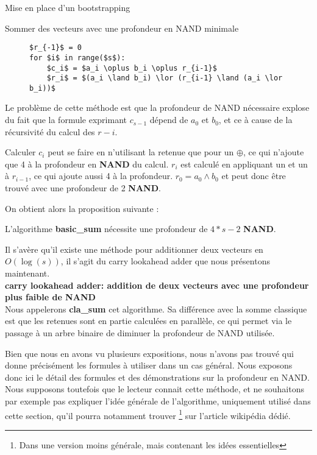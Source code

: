\begin{section}{Mise en place d'un bootstrapping}
\begin{subsection}{Sommer des vecteurs avec une profondeur en NAND minimale}
\begin{figure}[!h]
\begin{lstlisting}
$r_{-1}$ = 0
for $i$ in range($s$):
	$c_i$ = $a_i \oplus b_i \oplus r_{i-1}$
	$r_i$ = $(a_i \land b_i) \lor (r_{i-1} \land (a_i \lor b_i))$
\end{lstlisting}
\end{figure}

	Le problème de cette méthode est que la profondeur de NAND nécessaire explose du fait que la formule exprimant $c_{s-1}$ dépend de $a_0$ et $b_0$, et ce à cause de la récursivité du calcul des $r-i$.

	Calculer $c_i$ peut se faire en n'utilisant la retenue que pour un $\oplus$, ce qui n'ajoute que 4 à la profondeur en \textbf{NAND} du calcul. $r_i$ est calculé en appliquant un  et un  à $r_{i-1}$, ce qui ajoute aussi 4 à la profondeur. $r_0 = a_0 \land b_0$ et peut donc être trouvé avec une profondeur de 2 \textbf{NAND}.
	
	On obtient alors la proposition suivante :
\begin{prop}
	L'algorithme \textbf{basic\_sum} nécessite une profondeur de $4*s - 2$ \textbf{NAND}.
\end{prop}


Il s'avère qu'il existe une méthode pour additionner deux vecteurs 
en $O(\log(s))$, il s'agit du carry lookahead adder que nous présentons maintenant. \\

\textbf{carry lookahead adder: addition de deux vecteurs avec une profondeur plus faible de
NAND} \\

Nous appelerons \textbf{cla\_sum} cet algorithme. Sa différence avec la somme classique est que les retenues sont en partie calculées en parallèle, ce qui permet via le passage à un arbre binaire de diminuer la profondeur de NAND utilisée.

Bien que nous en avons vu plusieurs expositions, nous n'avons pas trouvé qui donne précisément les formules à utiliser dans un cas général. Nous exposons donc ici le détail des formules et des démonstrations sur la profondeur en NAND. Nous supposons toutefois que le lecteur connait cette méthode, et ne souhaitons par exemple pas expliquer l'idée générale de l'algorithme, uniquement utilisé dans cette section, qu'il pourra notamment trouver \footnote{Dans une version moins générale, mais contenant les idées essentielles} sur l'article wikipédia dédié\cite{wiki_cla}.


\end{subsection}
\end{section}
